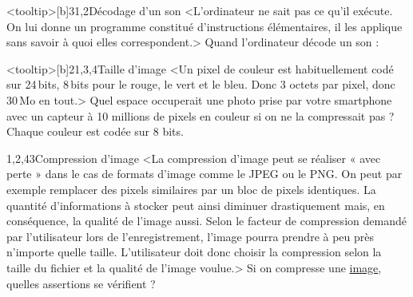 \begin{quiz}[title={Infographie et audionumérique}]
\begin{quizquestion*}<tooltip>[b]{3}{1,2}{Décodage d'un son}
<L'ordinateur ne sait pas ce qu'il exécute. On lui donne un programme constitué d'instructions élémentaires, il les applique sans savoir à quoi elles correspondent.>
Quand l'ordinateur décode un son :
\end{quizquestion*}
\end{quiz}


\begin{quiz}[title={Compression de données}]
\vspace{-1\baselineskip}
\begin{quizquestion*}<tooltip>[b]{2}{1,3,4}{Taille d'image}
<Un pixel de couleur est habituellement codé sur 24\,bits, 8\,bits pour le rouge, le vert et le bleu. Donc 3 octets par pixel, donc 30\,Mo en tout.>
Quel espace occuperait une photo prise par votre smartphone avec un capteur à 10 millions de pixels en couleur si on ne la compressait pas ? Chaque couleur est codée sur 8 bits.
\end{quizquestion*}



\vfill\pagebreak

\begin{quizquestion}[b]{1,2,4}{3}{Compression d'image}
<La compression d'image peut se réaliser « avec perte » dans le cas de formats d'image comme le JPEG ou le PNG. On peut par exemple remplacer des pixels similaires par un bloc de pixels identiques. La quantité d'informations à stocker peut ainsi diminuer drastiquement mais, en conséquence, la qualité de l'image aussi.
Selon le facteur de compression demandé par l'utilisateur lors de l'enregistrement, l'image pourra prendre à peu près n'importe quelle taille. L'utilisateur doit donc choisir la compression selon la taille du fichier et la qualité de l'image voulue.>
Si on compresse une \href{https://www.fun-mooc.fr/asset-v1:inria+41018+session01+type@asset+block@Untitled.jpg}{image}, quelles assertions se vérifient ?
\parnotes
\end{quizquestion}


\end{quiz}
